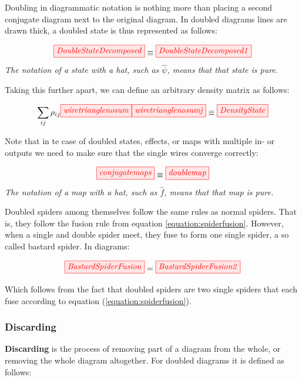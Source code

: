 \documentclass[]{article}
\begin{document}
Doubling in diagrammatic notation is nothing more than placing a second conjugate diagram
next to the original diagram. In doubled diagrams lines are drawn thick, a doubled state is thus
represented as follows:

\begin{equation}
	\label{equation:doubledstate}
	\tikzfig{DoubleStateDecomposed} \equiv \tikzfig{DoubleStateDecomposed1}
\end{equation}
\textit{The notation of a state with a hat, such as $\hat{\psi}$, means that that state is pure.}

Taking this further apart, we can define an arbitrary density matrix as follows:

\begin{equation}
	\label{equation:densitymatrix}
	 \sum\limits_{ij} \rho_{ij} \tikzfig{wiretrianglenosum} \tikzfig{wiretrianglenosumj} \equiv \tikzfig{DensityState}
\end{equation}

Note that in te case of doubled states, effects, or maps with multiple in- or outputs we need to make sure that the single wires converge correctly:

\begin{equation}
\label{equation:conjugatemaps}
\tikzfig{conjugatemaps} \equiv \tikzfig{doublemap}
\end{equation}
\textit{The notation of a map with a hat, such as $\hat{f}$, means that that map is pure.}

Doubled spiders among themselves follow the same rules as normal spiders. That is, they follow the fusion rule from equation \ref{equation:spiderfusion}. However, when a single and double spider meet, they fuse to form one single spider, a so called bastard spider. In diagrams:

\begin{equation}
\label{equation:bastardspiderfusion}
	\tikzfig{BastardSpiderFusion} = \tikzfig{BastardSpiderFusion2}
\end{equation}

Which follows from the fact that doubled spiders are two single spiders that each fuse according to equation (\ref{equation:spiderfusion}).
\subsubsection{Discarding}
\label{discarding}

\textbf{Discarding} is the process of removing part of a diagram from the whole, or removing the whole diagram altogether. For doubled diagrams it is defined as follows:
\end{document}
